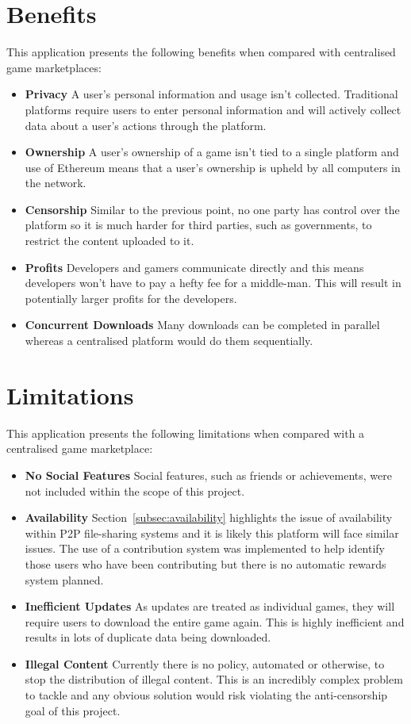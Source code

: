 
\section{Benefits}\label{des:benefits}

This application presents the following benefits when compared with centralised game marketplaces:

\begin{itemize}
  \item \textbf{Privacy} A user's personal information and usage isn't collected. Traditional platforms require users to enter personal information and will actively collect data about a user's actions through the platform.
  \item \textbf{Ownership} A user's ownership of a game isn't tied to a single platform and use of Ethereum means that a user's ownership is upheld by all computers in the network.
  \item \textbf{Censorship} Similar to the previous point, no one party has control over the platform so it is much harder for third parties, such as governments, to restrict the content uploaded to it.
  \item \textbf{Profits} Developers and gamers communicate directly and this means developers won't have to pay a hefty fee for a middle-man. This will result in potentially larger profits for the developers.  
  \item \textbf{Concurrent Downloads} Many downloads can be completed in parallel whereas a centralised platform would do them sequentially.
\end{itemize}

\section{Limitations}\label{sec:design-lim}

This application presents the following limitations when compared with a centralised game marketplace:

\begin{itemize}
  \item \textbf{No Social Features} Social features, such as friends or achievements, were not included within the scope of this project.
  \item \textbf{Availability} Section~\ref{subsec:availability} highlights the issue of availability within P2P file-sharing systems and it is likely this platform will face similar issues.
  The use of a contribution system was implemented to help identify those users who have been contributing but there is no automatic rewards system planned.
  \item \textbf{Inefficient Updates} As updates are treated as individual games, they will require users to download the entire game again. This is highly inefficient and results in lots of duplicate data being downloaded.
  \item \textbf{Illegal Content} Currently there is no policy, automated or otherwise, to stop the distribution of illegal content. This is an incredibly complex problem to tackle and any obvious solution would risk violating the anti-censorship goal of this project.
\end{itemize}